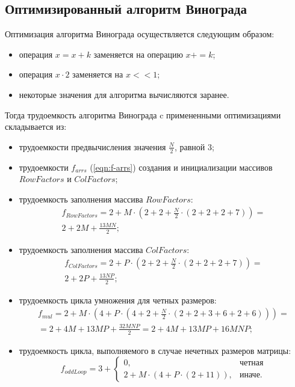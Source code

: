 \subsection{Оптимизированный алгоритм Винограда}

Оптимизация алгоритма Винограда осуществляется следующим образом:
\begin{itemize}
    \item операция $x = x + k$ заменяется на операцию $x += k$;
    \item операция $x \cdot 2$ заменяется на $x << 1$;
    \item некоторые значения для алгоритма вычисляются заранее.
\end{itemize}

Тогда трудоемкость алгоритма Винограда c примененными оптимизациями складывается из:
\begin{itemize}
    \item трудоемкости предвычисления значения $\frac{N}{2}$, равной 3;
    \item трудоемкости $f_{arrs}$ (\ref{eqn:f-arrs}) создания и инициализации массивов $RowFactors$ и $ColFactors$;
    \item трудоемкость заполнения массива $RowFactors$:
    \begin{equation}
        \begin{gathered}
            f_{RowFactors} = 2 + M \cdot (2 + 2 + \frac{N}{2} \cdot (2 + 2 + 2 + 7)) = \\
            2 + 2M + \frac{13MN}{2};
        \end{gathered}
    \end{equation}
    \item трудоемкость заполнения массива $ColFactors$:
    \begin{equation}
        \begin{gathered}
            f_{ColFactors} = 2 + P \cdot (2 + 2 + \frac{N}{2} \cdot (2 + 2 + 2 + 7)) = \\
            2 + 2P + \frac{13NP}{2};
        \end{gathered}
    \end{equation}
    \item трудоемкость цикла умножения для четных размеров:
    \begin{equation}
        \begin{gathered}
            f_{mul} = 2 + M \cdot (4 + P \cdot (4 + 2 + \frac{N}{2} \cdot (2 + 2 + 3 + 6 + 2 + 6))) = \\
            = 2 + 4M + 13MP + \frac{32MNP}{2} = 2 + 4M + 13MP + 16MNP;
        \end{gathered}
    \end{equation}
    \item трудоемкость цикла, выполняемого в случае нечетных размеров матрицы:
    \begin{equation}
        f_{oddLoop} = 3 + 
        \begin{cases}
            0, & \text{четная} \\
            2 + M \cdot (4 + P \cdot (2 + 11)), & \text{иначе.}
        \end{cases}
    \end{equation}
\end{itemize}
